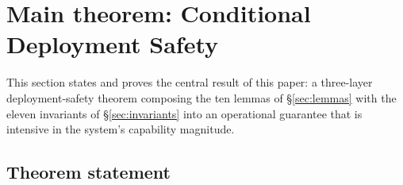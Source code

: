\section{Main theorem: Conditional Deployment Safety}
\label{sec:main_theorem}

This section states and proves the central result of this paper: a
three-layer deployment-safety theorem composing the ten lemmas of
\S\ref{sec:lemmas} with the eleven invariants of
\S\ref{sec:invariants} into an operational guarantee that is
intensive in the system's capability magnitude.

\subsection{Theorem statement}
\label{sec:theorem_statement}

